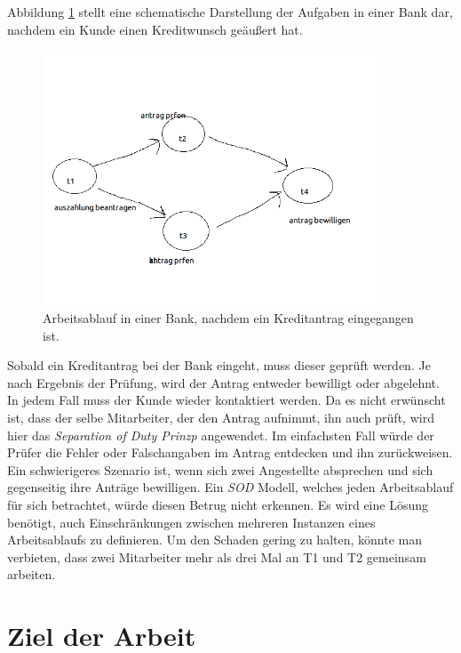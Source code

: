 Abbildung \ref{fig:WorkflowEinleitung} stellt eine schematische Darstellung der Aufgaben in einer Bank dar, nachdem ein Kunde einen Kreditwunsch geäußert hat.

\begin{figure}[ht]
	\centering
  \includegraphics[width=0.9\textwidth]{Figures/Workflow}
	\caption{Arbeitsablauf in einer Bank, nachdem ein Kreditantrag eingegangen ist.}
	\label{fig:WorkflowEinleitung}
\end{figure}

Sobald ein Kreditantrag bei der Bank eingeht, muss dieser geprüft werden. Je nach Ergebnis der Prüfung, wird der Antrag entweder bewilligt oder abgelehnt. In jedem Fall muss der Kunde wieder kontaktiert werden.
Da es nicht erwünscht ist, dass der selbe Mitarbeiter, der den Antrag aufnimmt, ihn auch prüft, wird hier das \textit{Separation of Duty Prinzp} angewendet. Im einfachsten Fall würde der Prüfer die Fehler oder Falschangaben im Antrag entdecken und ihn zurückweisen. Ein schwierigeres Szenario ist, wenn sich zwei Angestellte absprechen und sich gegenseitig ihre Anträge bewilligen. Ein \textit{SOD} Modell, welches jeden Arbeitsablauf für sich betrachtet, würde diesen Betrug nicht erkennen. Es wird eine Lösung benötigt, auch Einschränkungen zwischen mehreren Instanzen eines Arbeitsablaufs zu definieren. Um den Schaden gering zu halten, könnte man verbieten, dass zwei Mitarbeiter mehr als drei Mal an T1 und T2 gemeinsam arbeiten.




\section{Ziel der Arbeit}

